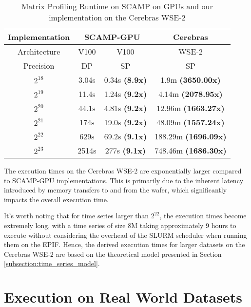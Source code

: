 \begin{table}[h!]
    \centering
    \renewcommand{\arraystretch}{1.25} %
    \caption{Matrix Profiling Runtime on SCAMP on GPUs and our implementation on the Cerebras WSE-2 \cite{4}}
    \begin{tabular}{|| c | c | c | c ||} 
        \hline
        Implementation & \multicolumn{2}{c|}{SCAMP-GPU} & Cerebras \\ [0.5ex] 
        \hline
        Architecture & V100 & V100 & WSE-2 \\
        \hline
        Precision & DP & SP & SP \\
        \hline\hline
        $2^{18}$ & 3.04s & 0.34s \textbf{(8.9x)} & 1.9m \textbf{(3650.00x)} \\
        \hline
        $2^{19}$ & 11.4s & 1.24s \textbf{(9.2x)} & 4.14m \textbf{(2078.95x)}\\
        \hline
        $2^{20}$ & 44.1s & 4.81s \textbf{(9.2x)} & 12.96m \textbf{(1663.27x)} \\
        \hline
        $2^{21}$ & 174s & 19.0s \textbf{(9.2x)} & 48.09m \textbf{(1557.24x)} \\
        \hline
        $2^{22}$ & 629s & 69.2s \textbf{(9.1x)} & 188.29m \textbf{(1696.09x)} \\
        \hline
        $2^{23}$ & 2514s & 277s \textbf{(9.1x)} & 748.46m \textbf{(1686.30x)} \\
        \hline
    \end{tabular}
    \label{tbl:performance}
\end{table}

The execution times on the Cerebras WSE-2 are exponentially larger compared to SCAMP-GPU implementations. This is primarily due to the inherent latency introduced by memory transfers to and from the wafer, which significantly impacts the overall execution time. 

It's worth noting that for time series larger than $2^{22}$, the execution times become extremely long, with a time series of size 8M taking approximately 9 hours to execute without considering the overhead of the SLURM scheduler when running them on the EPIF. Hence, the derived execution times for larger datasets on the Cerebras WSE-2 are based on the theoretical model presented in Section \ref{subsection:time_series_model}.

\clearpage

\section{Execution on Real World Datasets} \label{section:real_world_datasets}

